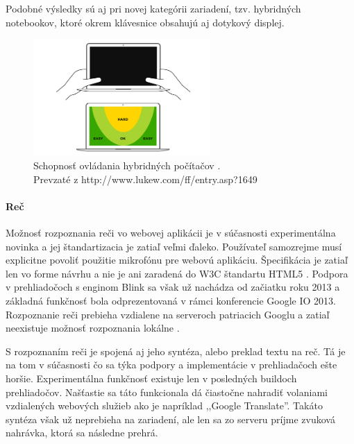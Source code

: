 Podobné výsledky \cite{mobilebooktouch} sú aj pri novej kategórii zariadení, tzv. hybridných notebookov, ktoré okrem klávesnice obsahujú aj dotykový displej.

\begin{figure}[H]
	\centering
	\includegraphics[width=0.6\textwidth]{img/tnav-touch-laptops.png}
	\caption[Schopnosť ovládania hybridných počítačov]{
		Schopnosť ovládania hybridných počítačov \cite{navigation}.\\
		Prevzaté z http://www.lukew.com/ff/entry.asp?1649}
	\label{fig: tnavlaptops}
\end{figure}



\paragraph{Reč} %

Možnosť rozpoznania reči vo webovej aplikácii je v súčasnosti experimentálna novinka a jej štandartizacia je zatiaľ veľmi ďaleko. Používateľ samozrejme musí explicitne povoliť použitie mikrofónu pre webovú aplikáciu. Špecifikácia je zatiaľ len vo forme návrhu a nie je ani zaradená do W3C štandartu HTML5 \cite{webspeechapi}. Podpora v prehliadočoch s enginom Blink sa však už nachádza od začiatku roku 2013 a základná funkčnosť bola odprezentovaná v rámci konferencie Google IO 2013. Rozpoznanie reči prebieha vzdialene na serveroch patriacich Googlu a zatiaľ neexistuje možnosť rozpoznania lokálne \cite{moreawesomeweb}.

S rozpoznaním reči je spojená aj jeho syntéza, alebo preklad textu na reč. Tá je na tom v súčasnosti čo sa týka podpory a implementácie v prehliadačoch ešte horšie. Experimentálna funkčnosť existuje len v posledných buildoch prehliadočov. Našťastie sa táto funkcionala dá čiastočne nahradiť volaniami vzdialených webových služieb ako je napríklad ,,Google Translate''. Takáto syntéza však už neprebieha na zariadení, ale len sa zo serveru príjme zvuková nahrávka, ktorá sa následne prehrá.

